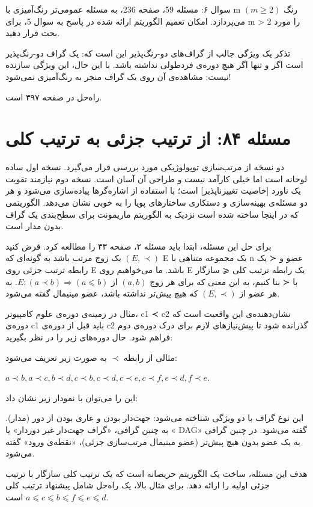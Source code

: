 \documentclass{book} %
\begin{document}
سوال ۶: مسئله 59، صفحه 236، به مسئله عمومی‌تر رنگ‌آمیزی با m رنگ $(m ≥ 2)$ می‌پردازد.
امکان تعمیم الگوریتم ارائه شده در پاسخ به سوال 5، برای m > 2 را مورد بحث قرار دهید.

تذکر
یک ویژگی جالب از گراف‌های دو-رنگ‌پذیر این است که: یک گراف دو-رنگ‌پذیر است اگر و تنها اگر هیچ دوره‌ی فردطولی نداشته باشد. با این حال، این ویژگی سازنده نیست: مشاهده‌ی آن روی یک گراف منجر به رنگ‌آمیزی نمی‌شود!

راه‌حل در صفحه ۳۹۷ است.

\newpage

\section {مسئله ۸۴: از ترتیب جزئی به ترتیب کلی}

دو نسخه از مرتب‌سازی توپولوژیکی مورد بررسی قرار می‌گیرد. نسخه اول ساده لوحانه است
اما خیلی کارآمد نیست و طراحی آن آسان است. نسخه دوم نیازمند تقویت یک ناورد [خاصیت
تغییرناپذیر] است؛ با استفاده از اشاره‌گرها پیاده‌سازی می‌شود و هر دو مسئله‌ی بهینه‌سازی و
دستکاری ساختارهای پویا را به خوبی نشان می‌دهد. الگوریتمی که در اینجا ساخته شده است
نزدیک به الگوریتم ماریمونت برای سطح‌بندی یک گراف بدون مدار است.

برای حل این مسئله، ابتدا باید مسئله ۲، صفحه ۳۳ را مطالعه کرد.
فرض کنید $(E, ≺)$ یک زوج مرتب باشد به گونه‌ای که E یک مجموعه متناهی با n عضو
و ≺ یک رابطه ترتیب جزئی روی E باشد. ما می‌خواهیم روی E یک رابطه ترتیب کلی
⩽ سازگار با ≺ بنا کنیم، به این معنی که برای هر زوج $(a, b)$ از $E: (a ≺ b) ⇒ (a ⩽ b)$.
به هر عضو از $(E, ≺)$ که هیچ پیش‌تر نداشته باشد، عضو مینیمال گفته می‌شود.


مثال
در زمینه‌ی دوره‌ی علوم کامپیوتر، c1 ≺ c2 نشان‌دهنده‌ی این واقعیت است که دوره‌ی c1 باید
قبل از دوره‌ی c2 گذرانده شود تا پیش‌نیازهای لازم برای درک دوره‌ی دوم فراهم شود.
حال دوره‌های زیر را در نظر بگیرید:


مثالی از رابطه $≺$ به صورت زیر تعریف می‌شود:

$a ≺ b, a ≺ c, b ≺ d, c ≺ b, c ≺ d, c ≺ e, c ≺ f, e ≺ d, f ≺ e$.

این را می‌توان با نمودار زیر نشان داد:

این نوع گراف با دو ویژگی شناخته می‌شود: جهت‌دار بودن و عاری بودن از دور
(مدار). به چنین گرافی، «گراف جهت‌دار غیر دوردار» یا « DAG» گفته می‌شود. در چنین
گرافی به یک عضو بدون هیچ پیش‌تر (عضو مینیمال مرتب‌سازی جزئی)، «نقطه‌ی ورود»
گفته می‌شود.

هدف این مسئله، ساخت یک الگوریتم حریصانه است که یک ترتیب کلی سازگار با ترتیب جزئی اولیه را ارائه دهد. برای مثال بالا، یک راه‌حل شامل پیشنهاد ترتیب کلی $a ⩽ c ⩽ b ⩽ f ⩽ e ⩽ d$ است.
\end{document}
